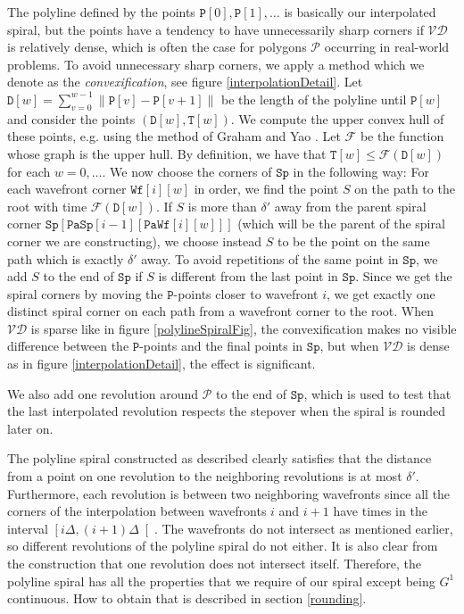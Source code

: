 \documentclass[3p]{elsarticle}
\newcommand{\VD}{\mathcal{VD}}
\newcommand{\PP}{\mathcal{P}}
\newcommand{\PPP}{\texttt{P}}
\newcommand{\FF}{\mathcal F}
\newcommand{\stepover}{\delta}
\newcommand{\tStepover}{\Delta}
\newcommand{\wavefront}{\texttt{Wf}}
\newcommand{\spiral}{\texttt{Sp}}
\newcommand{\parent}{\texttt{Pa}}
\newcommand{\parentWavefrontCorner}{\parent\wavefront}
\newcommand{\parentSpiralCorner}{\parent\spiral}
\begin{document}
The polyline defined by the points $\PPP[0],\PPP[1],\ldots$
is basically our interpolated spiral, but the points
have a tendency to have unnecessarily sharp corners if $\VD$ is relatively dense, which is
often the case for polygons $\PP$ occurring in real-world problems.
To avoid unnecessary sharp corners, we apply a method which we denote as the \emph{convexification},
see figure \ref{interpolationDetail}.
Let $\texttt{D}[w]=\sum_{v=0}^{w-1} \lVert\PPP[v]-\PPP[v+1]\rVert$ be the length of the polyline
until $\PPP[w]$ and consider the points $(\texttt{D}[w],\texttt{T}[w])$. We compute the upper
convex hull of these points, e.g. using the method of Graham and Yao \cite{graham1983}.
Let $\FF$ be the function whose graph
is the upper hull. By definition, we have that $\texttt{T}[w]\leq \FF(\texttt D[w])$
for each $w=0,\ldots$.
We now choose the corners of $\spiral$ in the following way:
For each wavefront corner $\wavefront[i][w]$ in order, we find the point $S$
on the path to the root with time
$\FF(\texttt D[w])$. If $S$ is more than $\stepover'$ away from the parent spiral corner
$\spiral[\parentSpiralCorner[i-1][\parentWavefrontCorner[i][w]]]$ (which will be the
parent of the spiral corner we are constructing), we
choose instead $S$ to be the point on the same path which is exactly $\stepover'$ away.
To avoid repetitions of the same point in $\spiral$, we add $S$ to the end of $\spiral$
if $S$ is different from the last point in $\spiral$.
Since we get the spiral corners by moving the $\PPP$-points closer to wavefront $i$,
we get exactly one distinct spiral corner on each path from a wavefront corner to the root.
When $\VD$ is sparse like in figure \ref{polylineSpiralFig}, the convexification makes no visible
difference between the $\PPP$-points and the final points in $\spiral$,
but when $\VD$ is dense as in figure \ref{interpolationDetail}, the effect is significant.

We also add one revolution around $\PP$ to the end of $\spiral$,
which is used to test that
the last interpolated revolution respects the stepover when the spiral is rounded later on.


The polyline spiral constructed as described clearly satisfies that the distance from
a point on one revolution to the neighboring revolutions is at most $\stepover'$.
Furthermore, each revolution is between two neighboring wavefronts
since all the corners of the interpolation between wavefronts $i$ and $i+1$ have times
in the interval $\left[i\tStepover,(i+1)\tStepover\right[$.
The wavefronts do not intersect as mentioned earlier, so different revolutions of
the polyline spiral do not either. It is also clear from the construction that
one revolution does not intersect itself.
Therefore, the polyline spiral has all the properties that we require of our spiral
except being $G^1$ continuous. How to obtain that is described in section
\ref{rounding}.
\end{document}
